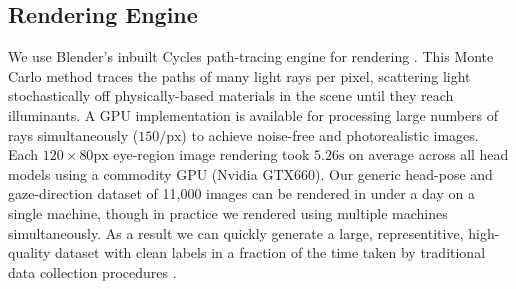 \subsection{Rendering Engine}

We use Blender's inbuilt Cycles path-tracing engine for rendering \cite{Cycles}.
This Monte Carlo method traces the paths of many light rays per pixel, scattering light stochastically off physically-based materials in the scene until they reach illuminants.
A GPU implementation is available for processing large numbers of rays simultaneously ($150/\textrm{px}$) to achieve noise-free and photorealistic images.
Each $120\!\times\!80\textrm{px}$ eye-region image rendering took $5.26\textrm{s}$ on average across all head models using a commodity GPU (Nvidia GTX660).
Our generic head-pose and gaze-direction dataset of 11,000 images can be rendered in under a day on a single machine, though in practice we rendered using multiple machines simultaneously.
As a result we can quickly generate a large, representitive, high-quality dataset with clean labels in a fraction of the time taken by traditional data collection procedures \cite{zhang15_cvpr} .